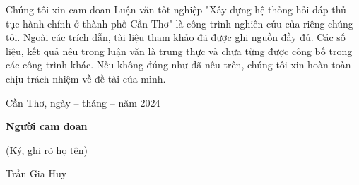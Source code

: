 Chúng tôi xin cam đoan Luận văn tốt nghiệp "Xây dựng hệ thống hỏi đáp thủ tục hành chính ở
thành phố Cần Thơ" \space là công trình nghiên cứu của riêng chúng tôi.
Ngoài các trích dẫn, tài liệu tham khảo đã được ghi nguồn đầy đủ.
Các số liệu, kết quả nêu trong luận văn là trung thực và chưa từng được công bố trong các công trình khác.
Nếu không đúng như đã nêu trên, chúng tôi xin hoàn toàn chịu trách nhiệm về đề tài của mình.

\begin{multicols}{2}
    \begin{minipage}{\linewidth}
    \end{minipage}

    \begin{minipage}{\linewidth}
        \centering
        Cần Thơ, ngày -- tháng -- năm 2024 %

        \textbf{Người cam đoan}

        (Ký, ghi rõ họ tên) \\

        \vspace{2.5cm}

        Trần Gia Huy
    \end{minipage}
\end{multicols}